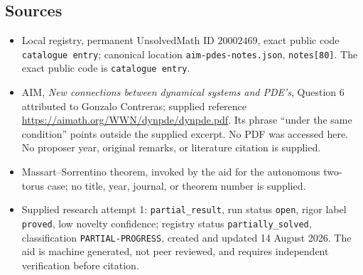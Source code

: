 \documentclass[11pt]{article}
\begin{document}
\subsection{Sources}
\begin{itemize}
\item Local registry, permanent UnsolvedMath ID \(20002469\), exact public code \texttt{catalogue entry\!}; canonical location \texttt{aim-pdes-notes.json}, \texttt{notes[80]}. The exact public code is \texttt{catalogue entry}.
\item AIM, \emph{New connections between dynamical systems and PDE's}, Question 6 attributed to Gonzalo Contreras; supplied reference \url{https://aimath.org/WWN/dynpde/dynpde.pdf}. Its phrase ``under the same condition'' points outside the supplied excerpt. No PDF was accessed here. No proposer year, original remarks, or literature citation is supplied.
\item Massart--Sorrentino theorem, invoked by the aid for the autonomous two-torus case; no title, year, journal, or theorem number is supplied.
\item Supplied research attempt 1: \texttt{partial\_result}, run status \texttt{open}, rigor label \texttt{proved}, low novelty confidence; registry status \texttt{partially\_solved}, classification \texttt{PARTIAL-PROGRESS}, created and updated 14 August 2026. The aid is machine generated, not peer reviewed, and requires independent verification before citation.
\end{itemize}
\end{document}
